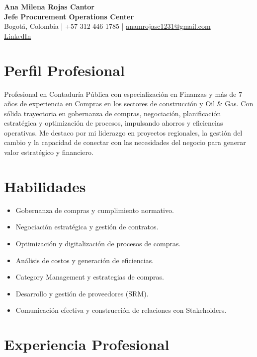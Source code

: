 \documentclass[11pt,a4paper]{article}
\begin{document}
\raggedright
\sloppy

\begin{center}
    {\LARGE \textbf{Ana Milena Rojas Cantor}}\\
    \textbf{Jefe Procurement Operations Center} \\
    Bogotá, Colombia | +57 312 446 1785 | \href{mailto:anamrojasc1231@gmail.com}{anamrojasc1231@gmail.com} \\
    \href{https://www.linkedin.com/in/alejandro-gutierrez-franco-06214674}{LinkedIn}
\end{center}

\section*{Perfil Profesional}
Profesional en Contaduría Pública con especialización en Finanzas y más de 7 años de experiencia en Compras en los sectores de construcción y Oil \& Gas. Con sólida trayectoria en gobernanza de compras, negociación, planificación estratégica y optimización de procesos, impulsando ahorros y eficiencias operativas. Me destaco por mi liderazgo en proyectos regionales, la gestión del cambio y la capacidad de conectar con las necesidades del negocio para generar valor estratégico y financiero.

\section*{Habilidades}
\begin{multicols}{2}
\begin{itemize}
    \item Gobernanza de compras y cumplimiento normativo.
    \item Negociación estratégica y gestión de contratos.
    \item Optimización y digitalización de procesos de compras.
    \item Análisis de costos y generación de eficiencias.
    \item Category Management y estrategias de compras.
    \item Desarrollo y gestión de proveedores (SRM).
    \item Comunicación efectiva y construcción de relaciones con Stakeholders.
\end{itemize}
\end{multicols}

\section*{Experiencia Profesional}
\end{document}
